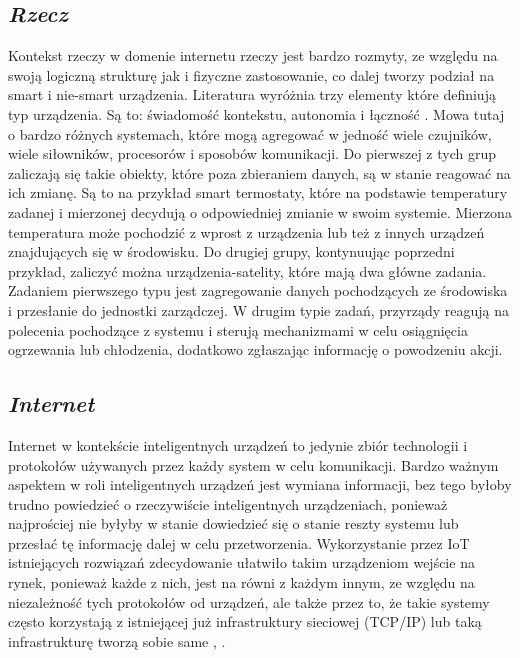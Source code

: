 \subsection{\textit{Rzecz}}
Kontekst rzeczy w domenie internetu rzeczy jest bardzo rozmyty, ze względu na swoją logiczną strukturę jak i fizyczne zastosowanie, co dalej tworzy podział na smart i nie-smart urządzenia. Literatura wyróżnia trzy elementy które definiują typ urządzenia. Są to: świadomość kontekstu, autonomia i łączność \cite{smart_dumb_devices}. Mowa tutaj o bardzo różnych systemach, które mogą agregować w jedność wiele czujników, wiele siłowników, procesorów i sposobów komunikacji. Do pierwszej z tych grup zaliczają się takie obiekty, które poza zbieraniem danych, są w stanie reagować na ich zmianę. Są to na przykład smart termostaty, które na podstawie temperatury zadanej i mierzonej decydują o odpowiedniej zmianie w swoim systemie. Mierzona temperatura może pochodzić z wprost z urządzenia lub też z innych urządzeń znajdujących się w środowisku. Do drugiej grupy, kontynuując poprzedni przykład, zaliczyć można urządzenia-satelity, które mają dwa główne zadania. Zadaniem pierwszego typu jest zagregowanie danych pochodzących ze środowiska i przesłanie do jednostki zarządczej. W drugim typie zadań, przyrządy reagują na polecenia pochodzące z systemu i sterują mechanizmami w celu osiągnięcia ogrzewania lub chłodzenia, dodatkowo zgłaszając informację o powodzeniu akcji.



\subsection{\textit{Internet}}
Internet w kontekście inteligentnych urządzeń to jedynie zbiór technologii i protokołów używanych przez każdy system w celu komunikacji. Bardzo ważnym aspektem w roli inteligentnych urządzeń jest wymiana informacji, bez tego byłoby trudno powiedzieć o rzeczywiście inteligentnych urządzeniach, ponieważ najprościej nie byłyby w stanie dowiedzieć się o stanie reszty systemu lub przesłać tę informację dalej w celu przetworzenia. Wykorzystanie przez IoT istniejących rozwiązań zdecydowanie ułatwiło takim urządzeniom wejście na rynek, ponieważ każde z nich, jest na równi z każdym innym, ze względu na niezależność tych protokołów od urządzeń, ale także przez to, że takie systemy często korzystają z istniejącej już infrastruktury sieciowej (TCP/IP) \cite{rfc791} lub taką infrastrukturę tworzą sobie same \cite{spontaneous_networking}, \cite{spontaneous_wireless_networking}.

